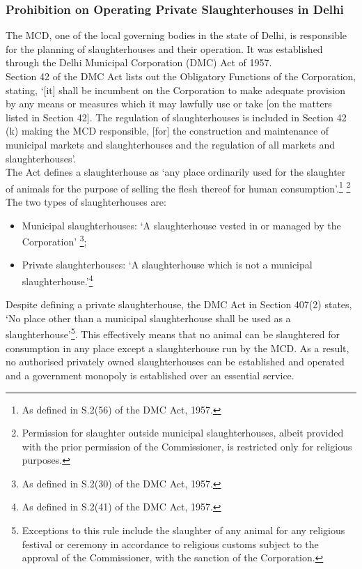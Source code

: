\documentclass[a4paper, 12pt]{article}
\begin{document}
\subsubsection{Prohibition on Operating Private Slaughterhouses in Delhi}

The MCD, one of the local governing bodies in the state of Delhi, is responsible for the planning of slaughterhouses and their operation. It was established through the Delhi Municipal Corporation (DMC) Act of 1957. \\

Section 42 of the DMC Act lists out the Obligatory Functions of the Corporation, stating, ‘[it] shall be incumbent on the Corporation to make adequate provision by any means or measures which it may lawfully use or take [on the matters listed in Section 42]. The regulation of slaughterhouses is included in Section 42 (k) making the MCD responsible, [for] the construction and maintenance of municipal markets and slaughterhouses and the regulation of all markets and slaughterhouses’.\\

The Act defines a slaughterhouse as ‘any place ordinarily used for the slaughter of animals for the purpose of selling the flesh thereof for human consumption’.\footnote{ As defined in S.2(56) of the DMC Act, 1957.}  \footnote{ Permission for slaughter outside municipal slaughterhouses, albeit provided with the prior permission of the Commissioner, is restricted only for religious purposes.} The two types of slaughterhouses are:

\begin{itemize}
\item Municipal slaughterhouses: ‘A slaughterhouse vested in or managed by the Corporation’ \footnote{ As defined in S.2(30) of the DMC Act, 1957.};
\item Private slaughterhouses: ‘A slaughterhouse which is not a municipal slaughterhouse.’\footnote{ As defined in S.2(41) of the DMC Act, 1957.}
\end{itemize}

Despite defining a private slaughterhouse, the DMC Act in Section 407(2) states, ‘No place other than a municipal slaughterhouse shall be used as a slaughterhouse’\footnote{ Exceptions to this rule include the slaughter of any animal for any religious festival or ceremony in accordance to religious customs subject to the approval of the Commissioner, with the sanction of the Corporation.}. This effectively means that no animal can be slaughtered for consumption in any place except a slaughterhouse run by the MCD. As a result, no authorised privately owned slaughterhouses can be established and operated and a government monopoly is established over an essential service. 
\end{document}
